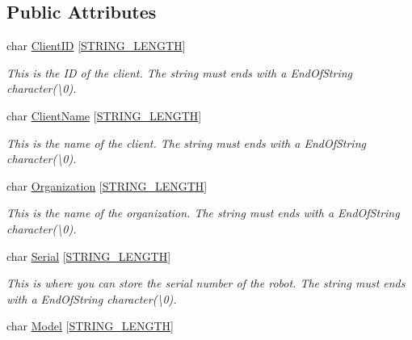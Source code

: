 \subsection*{Public Attributes}
\begin{DoxyCompactItemize}
\item 
char \hyperlink{struct_client_configurations_a2adccda7d27c7731ab0fe1160005e6ac}{Client\+ID} \mbox{[}\hyperlink{_kinova_types_8h_ac829415013d8120cedee928452ae0f55}{S\+T\+R\+I\+N\+G\+\_\+\+L\+E\+N\+G\+TH}\mbox{]}
\begin{DoxyCompactList}\small\item\em This is the ID of the client. The string must ends with a End\+Of\+String character(\textbackslash{}0). \end{DoxyCompactList}\item 
char \hyperlink{struct_client_configurations_a6ec42489c6a1e74a654809f5f39ca6f8}{Client\+Name} \mbox{[}\hyperlink{_kinova_types_8h_ac829415013d8120cedee928452ae0f55}{S\+T\+R\+I\+N\+G\+\_\+\+L\+E\+N\+G\+TH}\mbox{]}
\begin{DoxyCompactList}\small\item\em This is the name of the client. The string must ends with a End\+Of\+String character(\textbackslash{}0). \end{DoxyCompactList}\item 
char \hyperlink{struct_client_configurations_a55c82eb4163582b31c6d720766057767}{Organization} \mbox{[}\hyperlink{_kinova_types_8h_ac829415013d8120cedee928452ae0f55}{S\+T\+R\+I\+N\+G\+\_\+\+L\+E\+N\+G\+TH}\mbox{]}
\begin{DoxyCompactList}\small\item\em This is the name of the organization. The string must ends with a End\+Of\+String character(\textbackslash{}0). \end{DoxyCompactList}\item 
char \hyperlink{struct_client_configurations_adb0902769a42d7eaf9cce979d0779723}{Serial} \mbox{[}\hyperlink{_kinova_types_8h_ac829415013d8120cedee928452ae0f55}{S\+T\+R\+I\+N\+G\+\_\+\+L\+E\+N\+G\+TH}\mbox{]}
\begin{DoxyCompactList}\small\item\em This is where you can store the serial number of the robot. The string must ends with a End\+Of\+String character(\textbackslash{}0). \end{DoxyCompactList}\item 
char \hyperlink{struct_client_configurations_a5bb86440679384635d0d0f41ca431249}{Model} \mbox{[}\hyperlink{_kinova_types_8h_ac829415013d8120cedee928452ae0f55}{S\+T\+R\+I\+N\+G\+\_\+\+L\+E\+N\+G\+TH}\mbox{]}

\end{DoxyCompactItemize}
